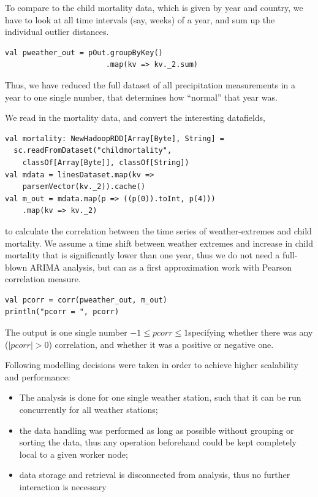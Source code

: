 \documentclass[
10pt, %
a4paper, %
oneside, %
headinclude,footinclude, %
useAMS,
usenatbib
]{template/mn2e}  %
\begin{document}
To compare to the child mortality data, which is given by year and country, we have to look at all time intervals (say, weeks) of a year, and sum up the individual outlier distances.

\begin{verbatim}
val pweather_out = pOut.groupByKey()
                       .map(kv => kv._2.sum)
\end{verbatim}

Thus, we have reduced the full dataset of all precipitation measurements in a year to one single number, that determines how “normal” that year was.

We read in the mortality data, and convert the interesting datafields,

\begin{verbatim}
val mortality: NewHadoopRDD[Array[Byte], String] =
  sc.readFromDataset("childmortality",
    classOf[Array[Byte]], classOf[String])
val mdata = linesDataset.map(kv =>
    parsemVector(kv._2)).cache()
val m_out = mdata.map(p => ((p(0)).toInt, p(4)))
    .map(kv => kv._2)
\end{verbatim}

to calculate the correlation between the time series of weather-extremes and child mortality. We assume a time shift between weather extremes and increase in child mortality that is significantly lower than one year, thus we do not need a full-blown ARIMA analysis, but can as a first approximation work with Pearson correlation measure.

\begin{verbatim}
val pcorr = corr(pweather_out, m_out)
println("pcorr = ", pcorr)
\end{verbatim}

The output is one single number $-1\leq pcorr\leq1$specifying whether there was any
($|pcorr|>0$) correlation, and whether it was a positive or negative
one.

Following modelling decisions were taken in order to achieve higher scalability and performance:

\begin{itemize}
    \item The analysis is done for one single weather station, such that it can be run concurrently for all weather stations;
    \item the data handling was performed as long as possible without grouping or sorting the data, thus any operation beforehand could be kept completely local to a given worker node;
    \item data storage and retrieval is disconnected from analysis, thus no further interaction is necessary
\end{itemize}
\end{document}
